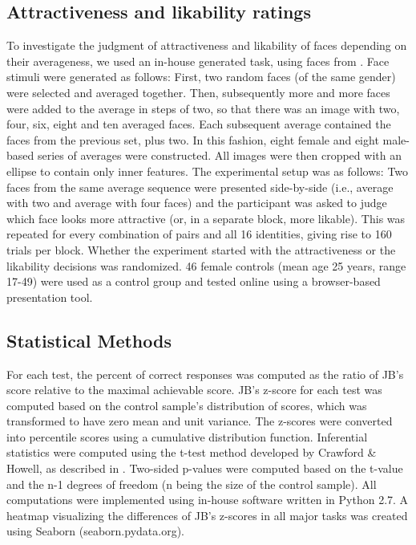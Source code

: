 \documentclass[fleqn,10pt]{SelfArx} %
\begin{document}
\subsection*{Attractiveness and likability ratings}
To investigate the judgment of attractiveness and likability of faces depending on their averageness, we used an in-house generated task, using faces from \citet{DeBruine2017}. Face stimuli were generated as follows: First, two random faces (of the same gender) were selected and averaged together. Then, subsequently more and more faces were added to the average in steps of two, so that there was an image with two, four, six, eight and ten averaged faces. Each subsequent average contained the faces from the previous set, plus two. In this fashion, eight female and eight male-based series of averages were constructed. All images were then cropped with an ellipse to contain only inner features.
The experimental setup was as follows: Two faces from the same average sequence were presented side-by-side (i.e., average with two and average with four faces) and the participant was asked to judge which face looks more attractive (or, in a separate block, more likable). This was repeated for every combination of pairs and all 16 identities, giving rise to 160 trials per block. Whether the experiment started with the attractiveness or the likability decisions was randomized. 46 female controls (mean age 25 years, range 17-49) were used as a control group and tested online using a browser-based presentation tool.

\subsection*{Statistical Methods}
For each test, the percent of correct responses was computed as the ratio of JB’s score relative to the maximal achievable score. JB’s z-score for each test was computed based on the control sample’s distribution of scores, which was transformed to have zero mean and unit variance. The z-scores were converted into percentile scores using a cumulative distribution function. Inferential statistics were computed using the t-test method developed by Crawford \& Howell, as described in \citet{Crawford_2009}. Two-sided p-values were computed based on the t-value and the n-1 degrees of freedom (n being the size of the control sample). All computations were implemented using in-house software written in Python 2.7. A heatmap visualizing the differences of JB’s z-scores in all major tasks was created using Seaborn (seaborn.pydata.org).
\end{document}
